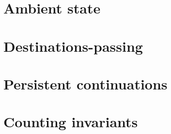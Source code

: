 \section{Ambient state}




\section{Destinations-passing}
\label{sec:gen-destinations}


\section{Persistent continuations}
\label{sec:gen-letcc}

\section{Counting invariants}



\label{sec:pointer-inequality}
